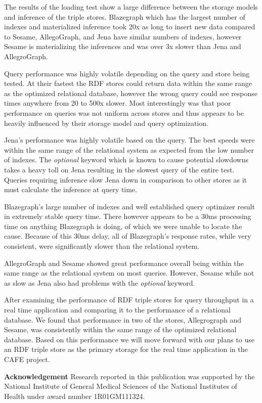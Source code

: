 \documentclass{llncs}
\begin{document}
The results of the loading test show a large difference between the storage models and inference of the triple stores.  Blazegraph which has the largest number of indexes and materialized inference took 20x as long to insert new data compared to Sesame, AllegoGraph, and Jena have similar numbers of indexes, however Sesame is materializing the inferences and was over 3x slower than Jena and AllegroGraph.

Query performance was highly volatile depending on the query and store being tested.  At their fastest the RDF stores could return data within the same range as the optimized relational database, however the wrong query could see response times anywhere from 20 to 500x slower.  Most interestingly was that poor performance on queries was not uniform across stores and thus appears to be heavily influenced by their storage model and query optimization.

Jena's performance was highly volatile based on the query.  The best speeds were within the same range of the relational system as expected from the low number of indexes.  The \emph{optional} keyword which is known to cause potential slowdowns takes a heavy toll on Jena resulting in the slowest query of the entire test.  Queries requiring inference slow Jena down in comparison to other stores as it must calculate the inference at query time.

Blazegraph's large number of indexes and well established query optimizer result in extremely stable query time. There however appears to be a 30ms processing time on anything Blazegraph is doing, of which we were unable to locate the cause.  Because of this 30ms delay, all of Blazegraph's response rates, while very consistent, were significantly slower than the relational system.

AllegroGraph and Sesame showed great performance overall being within the same range as the relational system on most queries.  However, Sesame while not as slow as Jena also had problems with the \emph{optional} keyword.

After examining the performance of RDF triple stores for query throughput in a real time application and comparing it to the performance of a relational database.  We found that performance in two of the stores, Allegrograph and Sesame, was consistently within the same range of the optimized relational database.  Based on this performance we will move forward with our plans to use an RDF triple store as the primary storage for the real time application in the CAFE project.

\medskip
\noindent
\textbf{Acknowledgement} Research reported in this publication was supported by the National Institute of General Medical Sciences of the National Institutes of Health under award number 1R01GM111324.



\end{document}
